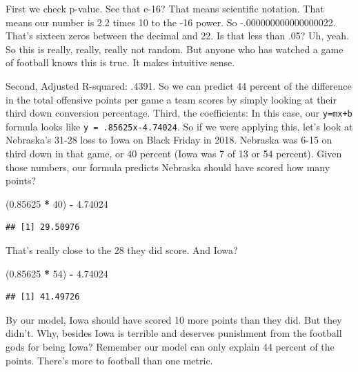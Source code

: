 \documentclass[]{book}
\newenvironment{Shaded}{\begin{snugshade}}{\end{snugshade}}
\newcommand{\DecValTok}[1]{\textcolor[rgb]{0.00,0.00,0.81}{#1}}
\newcommand{\FloatTok}[1]{\textcolor[rgb]{0.00,0.00,0.81}{#1}}
\newcommand{\StringTok}[1]{\textcolor[rgb]{0.31,0.60,0.02}{#1}}
\newcommand{\OperatorTok}[1]{\textcolor[rgb]{0.81,0.36,0.00}{\textbf{#1}}}
\newcommand{\NormalTok}[1]{#1}
\begin{document}
First we check p-value. See that e-16? That means scientific notation.
That means our number is 2.2 times 10 to the -16 power. So
-.000000000000000022. That's sixteen zeros between the decimal and 22.
Is that less than .05? Uh, yeah. So this is really, really, really not
random. But anyone who has watched a game of football knows this is
true. It makes intuitive sense.

Second, Adjusted R-squared: .4391. So we can predict 44 percent of the
difference in the total offensive points per game a team scores by
simply looking at their third down conversion percentage. Third, the
coefficients: In this case, our \texttt{y=mx+b} formula looks like
\texttt{y\ =\ .85625x-4.74024}. So if we were applying this, let's look
at Nebraska's 31-28 loss to Iowa on Black Friday in 2018. Nebraska was
6-15 on third down in that game, or 40 percent (Iowa was 7 of 13 or 54
percent). Given those numbers, our formula predicts Nebraska should have
scored how many points?

\begin{Shaded}
\begin{Highlighting}[]
\NormalTok{(}\FloatTok{0.85625} \OperatorTok{*}\StringTok{ }\DecValTok{40}\NormalTok{) }\OperatorTok{-}\StringTok{ }\FloatTok{4.74024} 
\end{Highlighting}
\end{Shaded}

\begin{verbatim}
## [1] 29.50976
\end{verbatim}

That's really close to the 28 they did score. And Iowa?

\begin{Shaded}
\begin{Highlighting}[]
\NormalTok{(}\FloatTok{0.85625} \OperatorTok{*}\StringTok{ }\DecValTok{54}\NormalTok{) }\OperatorTok{-}\StringTok{ }\FloatTok{4.74024} 
\end{Highlighting}
\end{Shaded}

\begin{verbatim}
## [1] 41.49726
\end{verbatim}

By our model, Iowa should have scored 10 more points than they did. But
they didn't. Why, besides Iowa is terrible and deserves punishment from
the football gods for being Iowa? Remember our model can only explain 44
percent of the points. There's more to football than one metric.
\end{document}
